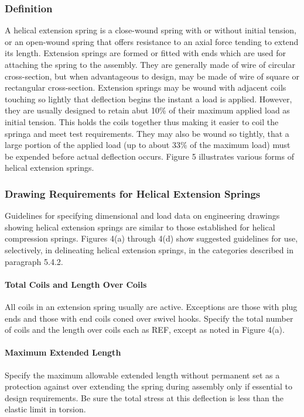 \documentclass[10pt]{article}
\begin{document}
\subsubsection{Definition}  %
A helical extension spring is a close-wound spring with or without initial tension, or an open-wound spring that offers resistance to an axial force tending to extend its length. 
Extension springs are formed or fitted with ends which are used for attaching the spring to the assembly. 
They are generally made of wire of circular cross-section, but when advantageous to design, may be made of wire of square or rectangular cross-section.
Extension springs may be wound with adjacent coils touching so lightly that deflection begins the instant a load is applied. However, they are usually designed to retain abut 10\% of their maximum applied load as initial tension. 
This holds the coils together thus making it easier to coil the springa and meet test requirements. 
They may also be wound so tightly, that a large portion of the applied load (up to about 33\% of the maximum load) must be expended before actual deflection occurs. 
Figure 5 illustrates various forms of helical extension springs.

\subsubsection{Drawing Requirements for Helical Extension Springs}  %
Guidelines for specifying dimensional and load data on engineering drawings showing helical extension springs
are similar to those established for helical compression springs. 
Figures 4(a) through 4(d) show suggested guidelines for use, selectively, in delineating helical extension springs, in the categories described in paragraph 5.4.2.

\paragraph{Total Coils and Length Over Coils}  %
All coils in an extension spring usually are active.
Exceptions are those with plug ends and those with end coils coned over swivel hooks. 
Specify the total number of coils and the length over coils each as REF, except as noted in Figure 4(a).

\paragraph{Maximum Extended Length}  %
Specify the maximum allowable extended length without permanent set as a protection against over extending the spring during assembly only if essential to design requirements.
Be sure the total stress at this deflection is less than the elastic limit in torsion.
\end{document}
